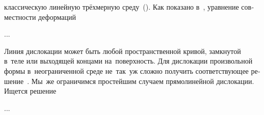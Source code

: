 

\thispagestyle{empty}

\label{chapter:defects}



\label{para:volterradislocations}

\begin{otherlanguage}{russian}

 классическую линейную трёхмерную среду~().
Как показано в~, уравнение совместности деформаций

...


\end{otherlanguage}



\label{para:rectilineardislocations}

\begin{otherlanguage}{russian}

Линия дислокации может быть любой пространственной кривой, замкнутой в~теле или выходящей концами на~поверхность.
Для дислокации произвольной формы в~неограниченной среде не~так~уж сложно получить соответствующее решение~\cite{eshelby-theoryofdislocations}.
Мы~же ограничимся простейшим случаем прямо\-линей\-ной дислокации.
Ищется решение

...


\end{otherlanguage}

